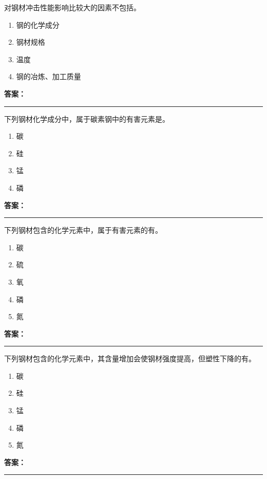 \documentclass[UTF8,fontset=fandol,11pt]{ctexart}
\newcommand{\answerline}{\textcolor{answerred}{\rule{2.4cm}{0.7pt}}}
\begin{document}
\begin{quizbox}[title={第 9 题}]
对钢材冲击性能影响比较大的因素不包括。\\
\begin{enumerate}[label=\Alph*.]
\item 钢的化学成分
\item 钢材规格
\item 温度
\item 钢的冶炼、加工质量
\end{enumerate}
\textbf{\textcolor{answerred}{答案：}} \answerline
\end{quizbox}

\begin{quizbox}[title={第 10 题}]
下列钢材化学成分中，属于碳素钢中的有害元素是。\\
\begin{enumerate}[label=\Alph*.]
\item 碳
\item 硅
\item 锰
\item 磷
\end{enumerate}
\textbf{\textcolor{answerred}{答案：}} \answerline
\end{quizbox}

\begin{quizbox}[title={第 11 题}]
下列钢材包含的化学元素中，属于有害元素的有。\\
\begin{enumerate}[label=\Alph*.]
\item 碳
\item 硫
\item 氧
\item 磷
\item 氮
\end{enumerate}
\textbf{\textcolor{answerred}{答案：}} \answerline
\end{quizbox}

\begin{quizbox}[title={第 12 题}]
下列钢材包含的化学元素中，其含量增加会使钢材强度提高，但塑性下降的有。\\
\begin{enumerate}[label=\Alph*.]
\item 碳
\item 硅
\item 锰
\item 磷
\item 氮
\end{enumerate}
\textbf{\textcolor{answerred}{答案：}} \answerline
\end{quizbox}
\end{document}
